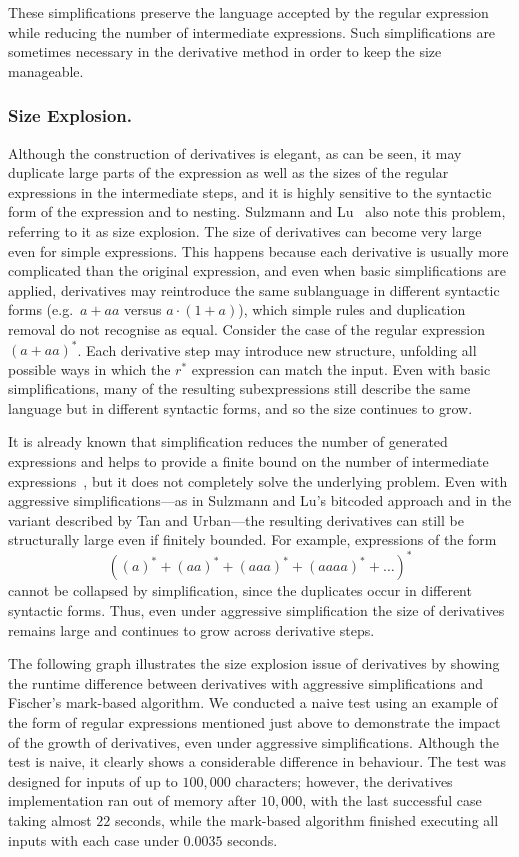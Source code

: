 \documentclass[12pt]{article}
\begin{document}
These simplifications preserve the language accepted by the regular expression
while reducing the number of intermediate expressions. Such simplifications are
sometimes necessary in the derivative method in order to keep the size
manageable.

\FloatBarrier
\subsubsection{Size Explosion.}  

Although the construction of derivatives is elegant, as can be seen, it may
duplicate large parts of the expression as well as the sizes of the regular
expressions in the intermediate steps, and it is highly sensitive to the
syntactic form of the expression and to nesting. Sulzmann and
Lu~\cite{Sulzmann2014} also note this problem, referring to it as size
explosion.
The size of derivatives can become very large even for simple expressions. 
This happens because each derivative is usually more complicated than the
original expression, and even when basic simplifications are applied,
derivatives may reintroduce the same sublanguage in different syntactic forms
(e.g.\ $a+aa$ versus $a \cdot (1+a)$), which simple rules and duplication
removal do not recognise as equal. Consider the case of the regular expression
$(a+aa)^*$. Each derivative step may introduce new structure, unfolding all
possible ways in which the $r^*$ expression can match the input. Even with
basic simplifications, many of the resulting subexpressions still describe the
same language but in different syntactic forms, and so the size continues to
grow.

It is already known that simplification reduces the number of generated
expressions and helps to provide a finite bound on the number of intermediate
expressions~\cite{Sulzmann2014,TanAndUrban2023}, but it does not completely
solve the underlying problem. Even with aggressive simplifications---as in
Sulzmann and Lu’s bitcoded approach and in the variant described by Tan and
Urban---the resulting derivatives can still be structurally large even if
finitely bounded. For example, expressions of the form
\[
((a)^* + (aa)^* + (aaa)^* + (aaaa)^* + \dots )^*
\]
cannot be collapsed by simplification, since the duplicates occur in different
syntactic forms. Thus, even under aggressive simplification the size of
derivatives remains large and continues to grow across derivative steps.

The following graph illustrates the size explosion issue of derivatives by showing the runtime 
difference between derivatives with aggressive simplifications and Fischer’s mark-based algorithm. 
We conducted a naive test using an example of the form of regular expressions mentioned just above 
to demonstrate the impact of the growth of derivatives, even under aggressive simplifications. 
Although the test is naive, it clearly shows a considerable difference in behaviour. The test was 
designed for inputs of up to $100{,}000$ characters; however, the derivatives implementation ran out 
of memory after $10{,}000$, with the last successful case taking almost $22$ seconds, while the 
mark-based algorithm finished executing all inputs with each case under $0.0035$ seconds.
\end{document}
